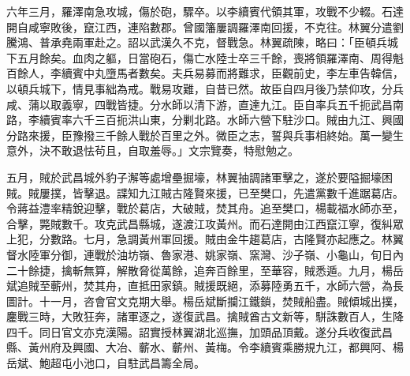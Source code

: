 \begin{pinyinscope}
六年三月，羅澤南急攻城，傷於砲，驟卒。以李續賓代領其軍，攻戰不少輟。石達開自咸寧敗後，竄江西，連陷數郡。曾國籓屢調羅澤南回援，不克往。林翼分遣劉騰鴻、普承堯兩軍赴之。詔以武漢久不克，督戰急。林翼疏陳，略曰：「臣頓兵城下五月餘矣。血肉之軀，日當砲石，傷亡水陸士卒三千餘，喪將領羅澤南、周得魁百餘人，李續賓中丸墮馬者數矣。夫兵易募而將難求，臣觀前史，李左車告韓信，以頓兵城下，情見事絀為戒。戰易攻難，自昔已然。故臣自四月後乃禁仰攻，分兵咸、蒲以取義寧，四戰皆捷。分水師以清下游，直達九江。臣自率兵五千扼武昌南路，李續賓率六千三百扼洪山東，分剿北路。水師六營下駐沙口。賊由九江、興國分路來援，臣豫撥三千餘人戰於百里之外。微臣之志，誓與兵事相終始。萬一變生意外，決不敢退怯茍且，自取羞辱。」文宗覽奏，特慰勉之。

五月，賊於武昌城外豹子澥等處增壘掘壕，林翼抽調諸軍擊之，遂於要隘掘壕困賊。賊屢撲，皆擊退。諜知九江賊古隆賢來援，已至樊口，先遣黨數千進踞葛店。令蔣益澧率精銳迎擊，戰於葛店，大破賊，焚其舟。追至樊口，楊載福水師亦至，合擊，斃賊數千。攻克武昌縣城，遂渡江攻黃州。而石達開由江西竄江寧，復糾眾上犯，分數路。七月，急調黃州軍回援。賊由金牛趨葛店，古隆賢亦起應之。林翼督水陸軍分御，連戰於油坊嶺、魯家港、姚家嶺、窯灣、沙子嶺、小龜山，旬日內二十餘捷，擒斬無算，解散脅從萬餘，追奔百餘里，至華容，賊悉遁。九月，楊岳斌追賊至蘄州，焚其舟，直抵田家鎮。賊援既絕，添募陸勇五千，水師六營，為長圖計。十一月，咨會官文克期大舉。楊岳斌斷攔江鐵鎖，焚賊船盡。賊傾城出撲，鏖戰三時，大敗狂奔，諸軍逐之，遂復武昌。擒賊酋古文新等，駢誅數百人，生降四千。同日官文亦克漢陽。詔實授林翼湖北巡撫，加頭品頂戴。遂分兵收復武昌縣、黃州府及興國、大冶、蘄水、蘄州、黃梅。令李續賓乘勝規九江，都興阿、楊岳斌、鮑超屯小池口，自駐武昌籌全局。


\end{pinyinscope}
